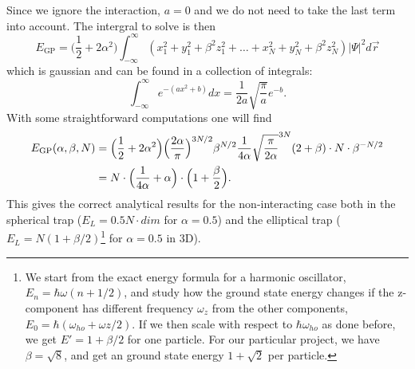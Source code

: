 \documentclass[norsk,a4paper,12pt]{article}
\begin{document}
Since we ignore the interaction, $a=0$ and we do not need to take the last term into account. The intergral to solve is then
\begin{equation*}
E_{\text{GP}}=\Big(\frac{1}{2}+2\alpha^2\Big)\int_{-\infty}^{\infty}(x_1^2+y_1^2+\beta^2 z_1^2 + \hdots + x_N^2+y_N^2+\beta^2 z_N^2)|\Psi|^2d\vec{r}
\end{equation*}
which is gaussian and can be found in a collection of integrals:
\begin{equation}
\int_{-\infty}^{\infty}e^{-(ax^2+b)}dx=\frac{1}{2a}\sqrt{\frac{\pi}{a}}e^{-b}.
\end{equation}
With some straightforward computations one will find
\begin{align}
E_{\text{GP}}(\alpha,\beta,N)&=\Big(\frac{1}{2}+2\alpha^2\Big)\Big(\frac{2\alpha}{\pi}\Big)^{3N/2}\beta^{N/2}\frac{1}{4\alpha}\sqrt{\frac{\pi}{2\alpha}}^{3N}(2+\beta)\cdot N\cdot \beta^{-N/2}\notag\\
&=N\cdot\Big(\frac{1}{4\alpha}+\alpha\Big)\cdot\Big(1+\frac{\beta}{2}\Big).
\end{align}
This gives the correct analytical results for the non-interacting case both in the spherical trap ($E_L=0.5N\cdot dim$ for $\alpha=0.5$) and the elliptical trap ($E_L=N(1+\beta/2)$\footnote{We start from the exact energy formula for a harmonic oscillator, $E_n=\hbar\omega(n+1/2)$, and study how the ground state energy changes if the z-component has different frequency $\omega_z$ from the other components, $E_0=\hbar(\omega_{ho}+\omega{z}/2)$. If we then scale with respect to $\hbar\omega_{ho}$ as done before, we get $E'=1+\beta/2$ for one particle. For our particular project, we have $\beta=\sqrt{8}$, and get an ground state energy $1+\sqrt{2}$ per particle.} for $\alpha=0.5$ in 3D).
\end{document}
